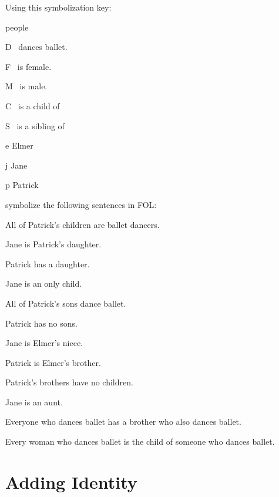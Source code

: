 \problempart
\label{pr.FOLballet}
Using this symbolization key:
\begin{ekey}
\item[\text{domain}] people
\item[D] \blank\ dances ballet.
\item[F] \blank\ is female.
\item[M] \blank\ is male.
\item[C] \blank\ is a child of \blank\
\item[S]\blank\  is a sibling of \blank\
\item[e] Elmer
\item[j] Jane
\item[p] Patrick
\end{ekey}
symbolize the following sentences in FOL:
\begin{earg}
\item All of Patrick's children are ballet dancers.
\item Jane is Patrick's daughter.
\item Patrick has a daughter.
\item Jane is an only child.
\item All of Patrick's sons dance ballet.
\item Patrick has no sons.
\item Jane is Elmer's niece.
\item Patrick is Elmer's brother.
\item Patrick's brothers have no children.
\item Jane is an aunt.
\item Everyone who dances ballet has a brother who also dances ballet.
\item Every woman who dances ballet is the child of someone who dances ballet.
\end{earg}


\section{Adding Identity}\label{s:identity}



